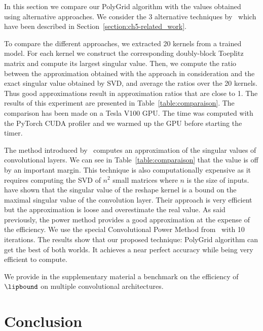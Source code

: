 In this section we compare our PolyGrid algorithm with the values obtained using alternative approaches.
We consider the 3 alternative techniques by~\citet{sedghi2018singular,singla2019bounding,farnia2018generalizable} which have been described in Section~\ref{section:ch5-related_work}. 

To compare the different approaches, we extracted 20 kernels from a trained model.
For each kernel we construct the corresponding doubly-block Toeplitz matrix and compute its largest singular value.
Then, we compute the ratio between the approximation obtained with the approach in consideration and the exact singular value obtained by SVD, and average the ratios over the 20 kernels.
Thus good approximations result in approximation ratios that are close to 1.
The results of this experiment are presented in Table~\ref{table:comparaison}.
The comparison has been made on a Tesla V100 GPU. 
The time was computed with the PyTorch CUDA profiler and we warmed up the GPU before starting the timer.

The method introduced by~\citet{sedghi2018singular} computes an approximation of the singular values of convolutional layers.
We can see in Table~\ref{table:comparaison} that the value is off by an important margin.
This technique is also computationally expensive as it requires computing the SVD of $n^2$ small matrices where $n$ is the size of inputs.
\citet{singla2019bounding} have shown that the singular value of the reshape kernel is a bound on the maximal singular value of the convolution layer.
Their approach is very efficient but the approximation is loose and overestimate the real value.
As said previously, the power method provides a good approximation at the expense of the efficiency.
We use the special Convolutional Power Method from~\citet{farnia2018generalizable} with 10 iterations.
The results show that our proposed technique: PolyGrid algorithm can get the best of both worlds.
It achieves a near perfect accuracy while being very efficient to compute. 

We provide in the supplementary material a benchmark on the efficiency of $\lipbound$ on multiple convolutional architectures. 



\section{Conclusion}
\label{section:ch5-conclusion}


